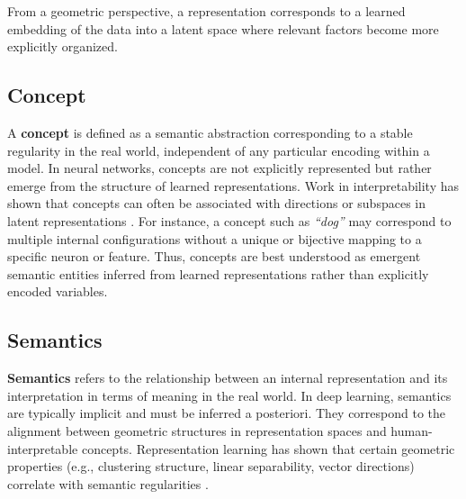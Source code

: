 From a geometric perspective, a representation corresponds to a learned embedding of the data into a latent space where relevant factors become more explicitly organized.

\subsection{Concept}

A \textbf{concept} is defined as a semantic abstraction corresponding to a stable regularity in the real world, independent of any particular encoding within a model.
In neural networks, concepts are not explicitly represented but rather emerge from the structure of learned representations.
Work in interpretability has shown that concepts can often be associated with directions or subspaces in latent representations \cite{bau2017network, kim2018tcav}.
For instance, a concept such as \textit{``dog''} may correspond to multiple internal configurations without a unique or bijective mapping to a specific neuron or feature.
Thus, concepts are best understood as emergent semantic entities inferred from learned representations rather than explicitly encoded variables.

\subsection{Semantics}

\textbf{Semantics} refers to the relationship between an internal representation and its interpretation in terms of meaning in the real world.
In deep learning, semantics are typically implicit and must be inferred a posteriori.
They correspond to the alignment between geometric structures in representation spaces and human-interpretable concepts.
Representation learning has shown that certain geometric properties (e.g., clustering structure, linear separability, vector directions) correlate with semantic regularities \cite{mikolov2013distributed, goodfellow2016deep}.